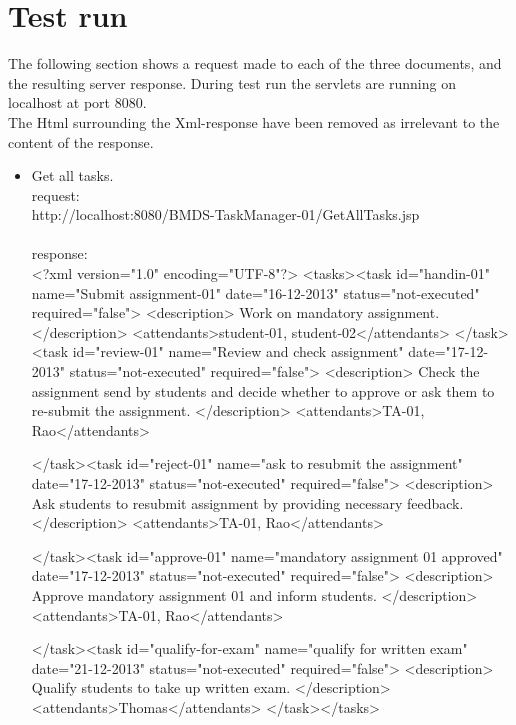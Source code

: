 \documentclass{report}
\begin{document}
	\section{Test run}
	\label{servlet_test}
	The following section shows a request made to each of the three documents, and the resulting server response. During test run the servlets are running on localhost at port 8080.\\
	The Html surrounding the Xml-response have been removed as irrelevant to the content of the response.\\
	\begin{itemize}
		\item
		Get all tasks.\\
		request:\\
		http://localhost:8080/BMDS-TaskManager-01/GetAllTasks.jsp\\\\
		
		response:\\
		<?xml version="1.0" encoding="UTF-8"?>
		<tasks><task id="handin-01" name="Submit assignment-01" date="16-12-2013" status="not-executed" required="false">
					<description>
						Work on mandatory assignment.
					</description>
					<attendants>student-01, student-02</attendants>
				</task><task id="review-01" name="Review and check assignment" date="17-12-2013" status="not-executed" required="false">
					<description>
						Check the assignment send by students and decide whether
						to approve or
						ask them to re-submit the assignment.
					</description>
					<attendants>TA-01, Rao</attendants>
		
				</task><task id="reject-01" name="ask to resubmit the assignment" date="17-12-2013" status="not-executed" required="false">
					<description>
						Ask students to resubmit assignment by providing
						necessary feedback.
					</description>
					<attendants>TA-01, Rao</attendants>
		
				</task><task id="approve-01" name="mandatory assignment 01 approved" date="17-12-2013" status="not-executed" required="false">
					<description>
						Approve mandatory assignment 01 and inform students.
					</description>
					<attendants>TA-01, Rao</attendants>
		
				</task><task id="qualify-for-exam" name="qualify for written exam" date="21-12-2013" status="not-executed" required="false">
					<description>
						Qualify students to take up written exam.
					</description>
					<attendants>Thomas</attendants>
				</task></tasks>
				\\\\
		

\end{itemize}
\end{document}
